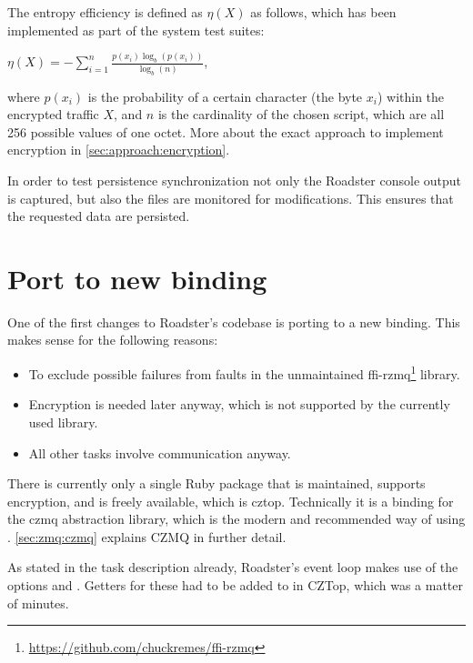 The entropy efficiency is defined as $\eta(X)$ as follows, which has been
implemented as part of the system test suites:

\begin{center}
$\eta(X) = -\sum_{i=1}^n \frac{p(x_i) \log_b (p(x_i))}{\log_b (n)}$,
\end{center}

where $p(x_i)$ is the probability of a certain character (the byte $x_i$)
within the encrypted traffic $X$, and $n$ is the cardinality of the chosen
script, which are all 256 possible values of one octet. More about the exact
approach to implement encryption in \autoref{sec:approach:encryption}.

In order to test persistence synchronization not only the Roadster console output is captured, 
but also the files are monitored for modifications. This ensures that the requested data
are persisted.



\section{Port to new \zmq binding}\label{sec:approach:port}
One of the first changes to Roadster's codebase is porting to a new \zmq
binding. This makes sense for the following reasons:

\begin{itemize}
\item To exclude possible failures from faults in the unmaintained ffi-rzmq\footnote{\url{https://github.com/chuckremes/ffi-rzmq}} library.
\item Encryption is needed later anyway, which is not supported by the currently used library.
\item All other tasks involve \zmq communication anyway.
\end{itemize}

There is currently only a single Ruby package that is maintained, supports
encryption, and is freely available, which is \gls{cztop}. Technically it is a
binding for the \gls{czmq} abstraction library, which is the modern and recommended way of
using \zmq. \autoref{sec:zmq:czmq} explains CZMQ in further detail.

As stated in the task description already, Roadster's event loop makes use of
the \zmq options  and . Getters for these had to be
added to in CZTop, which was a matter of minutes.

